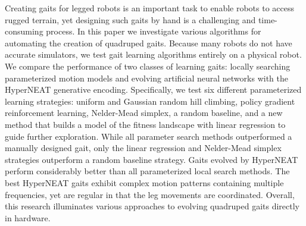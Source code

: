 Creating gaits for legged robots is an important task to enable robots to access rugged terrain, yet designing such gaits by hand is a challenging and time-consuming process. In this paper we investigate various algorithms for automating the creation of quadruped gaits. Because many robots do not have accurate simulators, we test gait learning algorithms entirely on a physical robot.  
	We compare the performance of two classes of learning gaits:
locally searching parameterized motion models and evolving artificial neural networks with the HyperNEAT generative encoding. Specifically, we test six different parameterized learning strategies: uniform and Gaussian random hill climbing, policy gradient
reinforcement learning, Nelder-Mead simplex, a random baseline, and a new method that
builds a model of the fitness landscape with linear regression to guide further exploration.
While all parameter search methods outperformed a manually designed
gait, only the linear regression and Nelder-Mead simplex strategies
outperform a random baseline strategy. Gaits evolved by HyperNEAT perform considerably better than all
parameterized local search methods.  The best HyperNEAT gaits exhibit
complex motion patterns containing multiple frequencies,
yet are regular in that the leg movements are coordinated. Overall, this research illuminates various approaches to evolving quadruped gaits directly in hardware.



